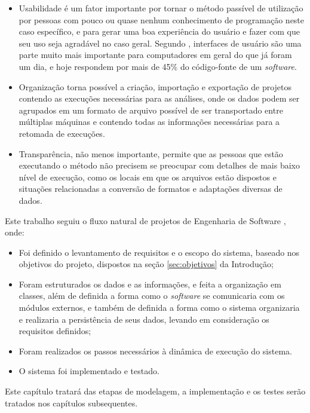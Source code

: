 \begin{itemize}
 \item{Usabilidade é um fator importante por tornar o método passível de utilização por pessoas com pouco ou quase nenhum conhecimento de programação neste
caso específico, e para gerar uma boa experiência do usuário e fazer com que seu uso seja agradável no caso geral. Segundo \cite{nielsen1993}, interfaces de
usuário são uma parte muito mais importante para computadores em geral do que já foram um dia, e hoje respondem por mais de 45\% do código-fonte de um
\textit{software}.}
  \item{Organização torna possível a criação, importação e exportação de projetos contendo as execuções necessárias para as análises,
onde os dados podem ser agrupados em um formato de arquivo possível de ser transportado entre múltiplas máquinas e contendo todas as informações
necessárias para a retomada de execuções.}
  \item{Transparência, não menos importante, permite que as pessoas que estão executando o método não precisem se
preocupar com detalhes de mais baixo nível de execução, como os locais em que os arquivos estão dispostos e situações relacionadas a conversão de
formatos e adaptações diversas de dados.}
\end{itemize}

Este trabalho seguiu o fluxo natural de projetos de Engenharia de Software \cite{softeng2005}, onde:

\begin{itemize}
  \item{Foi definido o levantamento de requisitos e o escopo do sistema, baseado nos objetivos do projeto,
dispostos na seção \ref{sec:objetivos} da Introdução;}
  \item{Foram estruturados os dados e as informações, e feita a organização em classes, além de definida a forma como o \textit{software}
se comunicaria com os módulos externos, e também de definida a forma como o sistema organizaria e realizaria a persistência de seus dados, levando
em consideração os requisitos definidos;}
  \item{Foram realizados os passos necessários à dinâmica de execução do sistema. }
  \item{O sistema foi implementado e testado.}
\end{itemize}

Este capítulo tratará das etapas de modelagem, a implementação e os testes serão tratados nos capítulos subsequentes.

